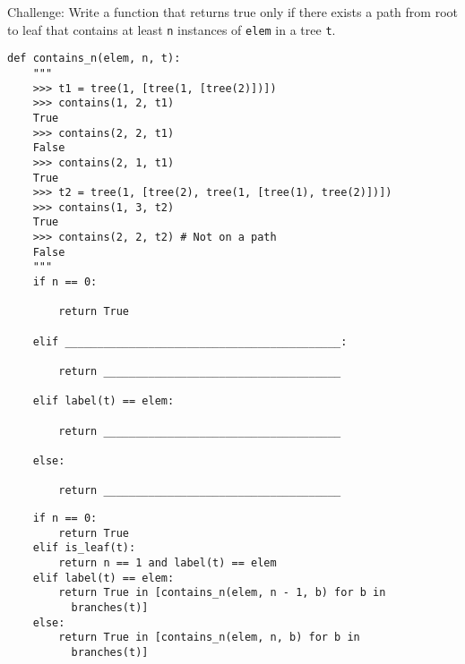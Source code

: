\begin{blocksection}
\question Challenge: Write a function that returns true only if there exists a path from root to leaf that contains at least \lstinline$n$ instances of \lstinline$elem$ in a tree \lstinline$t$.

\begin{lstlisting}
def contains_n(elem, n, t):
    """
    >>> t1 = tree(1, [tree(1, [tree(2)])])
    >>> contains(1, 2, t1)
    True
    >>> contains(2, 2, t1)
    False
    >>> contains(2, 1, t1)
    True
    >>> t2 = tree(1, [tree(2), tree(1, [tree(1), tree(2)])])
    >>> contains(1, 3, t2)
    True
    >>> contains(2, 2, t2) # Not on a path
    False
    """
    if n == 0:

        return True

    elif ___________________________________________:

        return _____________________________________

    elif label(t) == elem:

        return _____________________________________

    else:

        return _____________________________________
\end{lstlisting}
\end{blocksection}

\begin{blocksection}
\begin{solution}
\begin{lstlisting}
    if n == 0:
        return True
    elif is_leaf(t):
        return n == 1 and label(t) == elem
    elif label(t) == elem:
        return True in [contains_n(elem, n - 1, b) for b in     
          branches(t)]
    else:
        return True in [contains_n(elem, n, b) for b in 
          branches(t)]
\end{lstlisting}
\end{solution}
\end{blocksection}
